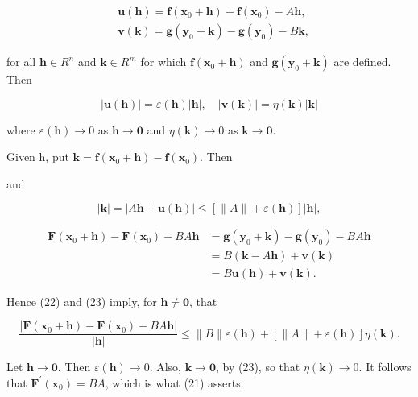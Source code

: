 \documentclass[10pt]{article}
\begin{document}
$$
\begin{aligned}
& \mathbf{u}(\mathbf{h})=\mathbf{f}\left(\mathbf{x}_{0}+\mathbf{h}\right)-\mathbf{f}\left(\mathbf{x}_{0}\right)-A \mathbf{h}, \\
& \mathbf{v}(\mathbf{k})=\mathbf{g}\left(\mathbf{y}_{0}+\mathbf{k}\right)-\mathbf{g}\left(\mathbf{y}_{0}\right)-B \mathbf{k},
\end{aligned}
$$

for all $\mathbf{h} \in R^{n}$ and $\mathbf{k} \in R^{m}$ for which $\mathbf{f}\left(\mathbf{x}_{0}+\mathbf{h}\right)$ and $\mathbf{g}\left(\mathbf{y}_{0}+\mathbf{k}\right)$ are defined. Then

$$
|\mathbf{u}(\mathbf{h})|=\varepsilon(\mathbf{h})|\mathbf{h}|, \quad|\mathbf{v}(\mathbf{k})|=\eta(\mathbf{k})|\mathbf{k}|
$$

where $\varepsilon(\mathbf{h}) \rightarrow 0$ as $\mathbf{h} \rightarrow \mathbf{0}$ and $\eta(\mathbf{k}) \rightarrow 0$ as $\mathbf{k} \rightarrow \mathbf{0}$.

Given h, put $\mathbf{k}=\mathbf{f}\left(\mathbf{x}_{0}+\mathbf{h}\right)-\mathbf{f}\left(\mathbf{x}_{0}\right)$. Then

and

$$
|\mathbf{k}|=|A \mathbf{h}+\mathbf{u}(\mathbf{h})| \leq[\|A\|+\varepsilon(\mathbf{h})]|\mathbf{h}|,
$$

$$
\begin{aligned}
\mathbf{F}\left(\mathbf{x}_{0}+\mathbf{h}\right)-\mathbf{F}\left(\mathbf{x}_{0}\right)-B A \mathbf{h} & =\mathbf{g}\left(\mathbf{y}_{0}+\mathbf{k}\right)-\mathbf{g}\left(\mathbf{y}_{0}\right)-B A \mathbf{h} \\
& =B(\mathbf{k}-A \mathbf{h})+\mathbf{v}(\mathbf{k}) \\
& =B \mathbf{u}(\mathbf{h})+\mathbf{v}(\mathbf{k}) .
\end{aligned}
$$

Hence (22) and (23) imply, for $\mathbf{h} \neq \mathbf{0}$, that

$$
\frac{\left|\mathbf{F}\left(\mathbf{x}_{0}+\mathbf{h}\right)-\mathbf{F}\left(\mathbf{x}_{0}\right)-B A \mathbf{h}\right|}{|\mathbf{h}|} \leq\|B\| \varepsilon(\mathbf{h})+[\|A\|+\varepsilon(\mathbf{h})] \eta(\mathbf{k}) .
$$

Let $\mathbf{h} \rightarrow \mathbf{0}$. Then $\varepsilon(\mathbf{h}) \rightarrow 0$. Also, $\mathbf{k} \rightarrow \mathbf{0}$, by (23), so that $\eta(\mathbf{k}) \rightarrow 0$. It follows that $\mathbf{F}^{\prime}\left(\mathbf{x}_{0}\right)=B A$, which is what (21) asserts.
\end{document}
